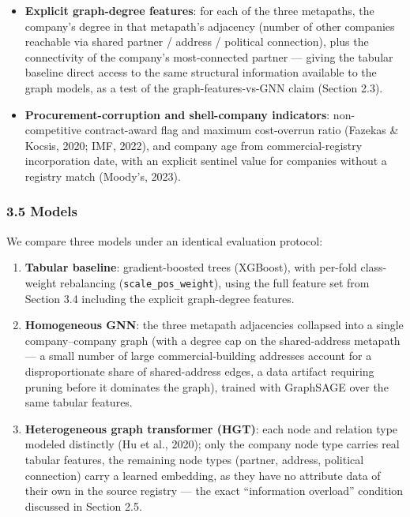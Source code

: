 \documentclass[11pt,]{article}
\providecommand{\tightlist}{%
  \setlength{\itemsep}{0pt}\setlength{\parskip}{0pt}}
\begin{document}
\begin{itemize}
\tightlist
\item
  \textbf{Explicit graph-degree features}: for each of the three
  metapaths, the company's degree in that metapath's adjacency (number
  of other companies reachable via shared partner / address / political
  connection), plus the connectivity of the company's most-connected
  partner --- giving the tabular baseline direct access to the same
  structural information available to the graph models, as a test of the
  graph-features-vs-GNN claim (Section 2.3).
\item
  \textbf{Procurement-corruption and shell-company indicators}:
  non-competitive contract-award flag and maximum cost-overrun ratio
  (Fazekas \& Kocsis, 2020; IMF, 2022), and company age from
  commercial-registry incorporation date, with an explicit sentinel
  value for companies without a registry match (Moody's, 2023).
\end{itemize}

\hypertarget{models}{%
\subsubsection{3.5 Models}\label{models}}

We compare three models under an identical evaluation protocol:

\begin{enumerate}
\def\labelenumi{\arabic{enumi}.}
\tightlist
\item
  \textbf{Tabular baseline}: gradient-boosted trees (XGBoost), with
  per-fold class-weight rebalancing (\texttt{scale\_pos\_weight}), using
  the full feature set from Section 3.4 including the explicit
  graph-degree features.
\item
  \textbf{Homogeneous GNN}: the three metapath adjacencies collapsed
  into a single company--company graph (with a degree cap on the
  shared-address metapath --- a small number of large
  commercial-building addresses account for a disproportionate share of
  shared-address edges, a data artifact requiring pruning before it
  dominates the graph), trained with GraphSAGE over the same tabular
  features.
\item
  \textbf{Heterogeneous graph transformer (HGT)}: each node and relation
  type modeled distinctly (Hu et al., 2020); only the company node type
  carries real tabular features, the remaining node types (partner,
  address, political connection) carry a learned embedding, as they have
  no attribute data of their own in the source registry --- the exact
  ``information overload'' condition discussed in Section 2.5.
\end{enumerate}
\end{document}
